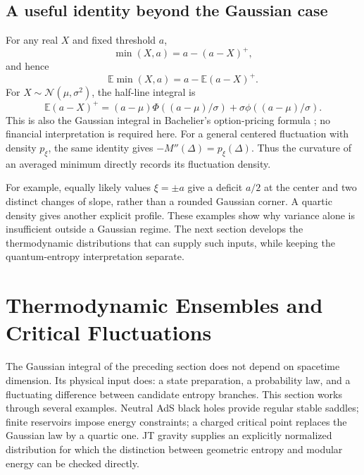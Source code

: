 \documentclass[11pt,letterpaper]{article}
\theoremstyle{plain}
\theoremstyle{definition}
\theoremstyle{remark}
\begin{document}
\subsection{A useful identity beyond the Gaussian case}
\label{subsec08:bachelier}

For any real $X$ and fixed threshold $a$,
\begin{equation}
 \min(X,a)=a-(a-X)^+,
 \label{eq08:min_put_identity}
\end{equation}
and hence
\begin{equation}
 \mathbb E\min(X,a)=a-\mathbb E(a-X)^+.
 \label{eq08:min_put_expectation}
\end{equation}
For $X\sim\mathcal N(\mu,\sigma^2)$, the half-line integral is
\begin{equation}
 \mathbb E(a-X)^+=(a-\mu)\Phi((a-\mu)/\sigma)
                  +\sigma\phi((a-\mu)/\sigma).
 \label{eq08:bachelier_put}
\end{equation}
This is also the Gaussian integral in Bachelier's option-pricing formula
\citep{bachelier1900}; no financial interpretation is required here.
For a general centered fluctuation with density $p_\xi$, the same identity
gives $-M''(\Delta)=p_\xi(\Delta)$. Thus the curvature of an averaged minimum
directly records its fluctuation density.

For example, equally likely values $\xi=\pm a$ give a deficit $a/2$ at the
center and two distinct changes of slope, rather than a rounded Gaussian
corner. A quartic density gives another explicit profile. These examples
show why variance alone is insufficient outside a Gaussian regime.
The next section develops the thermodynamic distributions that can supply
such inputs, while keeping the quantum-entropy interpretation separate.

\section{Thermodynamic Ensembles and Critical Fluctuations}
\label{sec09:higher_dimensions}

The Gaussian integral of the preceding section does not depend on spacetime
dimension. Its physical input does: a state preparation, a probability law,
and a fluctuating difference between candidate entropy branches. This section
works through several examples. Neutral AdS black holes provide regular
stable saddles; finite reservoirs impose energy constraints; a charged
critical point replaces the Gaussian law by a quartic one. JT gravity supplies
an explicitly normalized distribution for which the distinction between
geometric entropy and modular energy can be checked directly.
\end{document}
